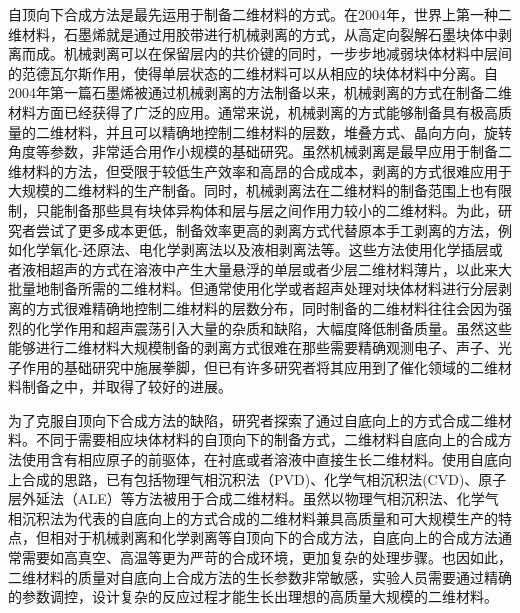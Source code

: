     自顶向下合成方法是最先运用于制备二维材料的方式。在2004年，世界上第一种二维材料，石墨烯就是通过用胶带进行机械剥离的方式，从高定向裂解石墨块体中剥离而成。机械剥离可以在保留层内的共价键的同时，一步步地减弱块体材料中层间的范德瓦尔斯作用，使得单层状态的二维材料可以从相应的块体材料中分离。自2004年第一篇石墨烯被通过机械剥离的方法制备以来，机械剥离的方式在制备二维材料方面已经获得了广泛的应用。通常来说，机械剥离的方式能够制备具有极高质量的二维材料，并且可以精确地控制二维材料的层数，堆叠方式、晶向方向，旋转角度等参数，非常适合用作小规模的基础研究。虽然机械剥离是最早应用于制备二维材料的方法，但受限于较低生产效率和高昂的合成成本，剥离的方式很难应用于大规模的二维材料的生产制备。同时，机械剥离法在二维材料的制备范围上也有限制，只能制备那些具有块体异构体和层与层之间作用力较小的二维材料。为此，研究者尝试了更多成本更低，制备效率更高的剥离方式代替原本手工剥离的方法，例如化学氧化-还原法、电化学剥离法以及液相剥离法等。这些方法使用化学插层或者液相超声的方式在溶液中产生大量悬浮的单层或者少层二维材料薄片，以此来大批量地制备所需的二维材料。但通常使用化学或者超声处理对块体材料进行分层剥离的方式很难精确地控制二维材料的层数分布，同时制备的二维材料往往会因为强烈的化学作用和超声震荡引入大量的杂质和缺陷，大幅度降低制备质量。虽然这些能够进行二维材料大规模制备的剥离方式很难在那些需要精确观测电子、声子、光子作用的基础研究中施展拳脚，但已有许多研究者将其应用到了催化领域的二维材料制备之中，并取得了较好的进展。

    为了克服自顶向下合成方法的缺陷，研究者探索了通过自底向上的方式合成二维材料。不同于需要相应块体材料的自顶向下的制备方式，二维材料自底向上的合成方法使用含有相应原子的前驱体，在衬底或者溶液中直接生长二维材料。使用自底向上合成的思路，已有包括物理气相沉积法（PVD)、化学气相沉积法(CVD)、原子层外延法（ALE）等方法被用于合成二维材料。虽然以物理气相沉积法、化学气相沉积法为代表的自底向上的方式合成的二维材料兼具高质量和可大规模生产的特点，但相对于机械剥离和化学剥离等自顶向下的合成方法，自底向上的合成方法通常需要如高真空、高温等更为严苛的合成环境，更加复杂的处理步骤。也因如此，二维材料的质量对自底向上合成方法的生长参数非常敏感，实验人员需要通过精确的参数调控，设计复杂的反应过程才能生长出理想的高质量大规模的二维材料。

